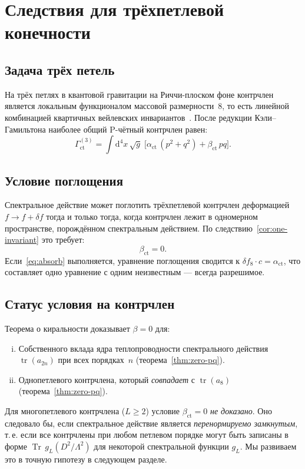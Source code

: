 \documentclass[12pt,a4paper]{article}
\theoremstyle{definition}
\theoremstyle{remark}
\newcommand{\dd}{\mathrm{d}}
\newcommand{\Tr}{\operatorname{Tr}}
\newcommand{\tr}{\operatorname{tr}}
\newcommand{\Lam}{\Lambda}
\begin{document}
\section{Следствия для трёхпетлевой конечности}
\label{sec:threeloop}

\subsection{Задача трёх петель}

На трёх петлях в квантовой гравитации на Риччи-плоском фоне контрчлен
является локальным функционалом массовой размерности~8, то есть линейной
комбинацией квартичных вейлевских
инвариантов~\cite{Goroff:1985th,Stelle:1976gc,vandeVen:1992gw}.  После
редукции Кэли--Гамильтона наиболее общий P-чётный контрчлен равен:
\begin{equation}\label{eq:ct}
  \Gamma_{\mathrm{ct}}^{(3)} = \int \dd^4x\,\sqrt{g}\;
  \bigl[\alpha_{\mathrm{ct}}\,(p^2 + q^2) + \beta_{\mathrm{ct}}\,pq\bigr].
\end{equation}

\subsection{Условие поглощения}

Спектральное действие может поглотить трёхпетлевой контрчлен деформацией
$f \to f + \delta f$ тогда и только тогда, когда контрчлен лежит в
одномерном пространстве, порождённом спектральным действием.  По
следствию~\ref{cor:one-invariant} это требует:
\begin{equation}\label{eq:absorb}
  \beta_{\mathrm{ct}} = 0.
\end{equation}
Если~\eqref{eq:absorb} выполняется, уравнение поглощения сводится к
$\delta f_8 \cdot c = \alpha_{\mathrm{ct}}$, что составляет одно уравнение
с одним неизвестным --- всегда разрешимое.

\subsection{Статус условия на контрчлен}

Теорема о киральности доказывает $\beta = 0$ для:
\begin{enumerate}[(i)]
  \item Собственного вклада ядра теплопроводности спектрального действия
    $\tr(a_{2n})$ при всех порядках~$n$ (теорема~\ref{thm:zero-pq}).
  \item Однопетлевого контрчлена, который \emph{совпадает} с $\tr(a_8)$
    (теорема~\ref{thm:zero-pq}).
\end{enumerate}
Для многопетлевого контрчлена ($L \geq 2$) условие
$\beta_{\mathrm{ct}} = 0$ \emph{не доказано}.  Оно следовало бы, если
спектральное действие является \emph{перенормируемо замкнутым}, т.\,е. если
все контрчлены при любом петлевом порядке могут быть записаны в форме
$\Tr\,g_L(D^2/\Lam^2)$ для некоторой спектральной функции $g_L$.
Мы развиваем это в точную гипотезу в следующем разделе.
\end{document}

